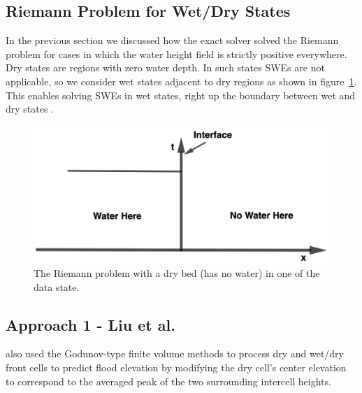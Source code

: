 \documentclass[11pt,a4paper]{article}
\newcommand{\donna}[1]{{\color{red}{#1}}}
\newcommand{\ignore}[1]{}
\begin{document}
	\subsection{Riemann Problem for Wet/Dry States}
	
	In the previous section we discussed how the exact solver solved the Riemann problem for cases in which the water height field is strictly positive everywhere. Dry states are regions with zero water depth. In such states SWEs are not applicable, so we consider wet states adjacent to dry regions as shown in figure~\ref{fig:dry-bed}. This enables solving SWEs in wet states, right up the boundary between wet and dry states \cite{toro2001shock,ge:2008}.
	\begin{figure}[H]
		\centering
		\includegraphics[width=0.5\linewidth]{images/dv}
		\caption{ The Riemann problem with a dry bed (has no water) in one of the data state. }
		\label{fig:dry-bed}
	\end{figure}
	
	\donna{Include a few plots of an evolution of a wet/dry state.  These were solved using Toro's method, described  below.}

	\subsection{Approach 1 - Liu et al.}
	\donna{Please modify the titles : "XXX Approach (Liu)" }
					\citet{li-ta-wa-ca-ba-ch-li:2021} also used the Godunov-type finite volume methods to process dry and wet/dry front cells to predict flood elevation by modifying the dry cell's center elevation to correspond to the averaged peak of the two surrounding intercell heights. 
					\donna{Don't mention George here;  you do that below.}
					\ignore{However, in \cite{ge:2008}, George used an approximate Riemann solver for the shallow water equations (SWE) to decompose an augmented solution vector into four propagating waves. This maintained excellent features in the approximate solution, such as preserving depth non-negativity, shockwave solutions capturing, e.t.c., making the solver appropriate for modeling SWE when steady states and dry cells exist.}
\end{document}
